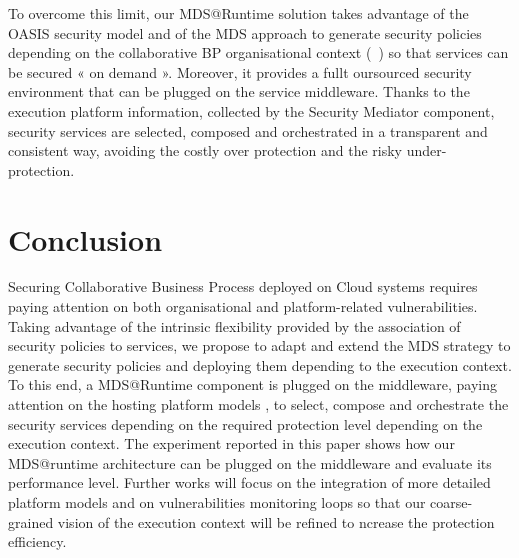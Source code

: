 \documentclass[runningheads,a4paper]{llncs}
\begin{document}
To overcome this limit, our MDS@Runtime solution takes advantage of the OASIS security model and of the MDS approach to generate security policies depending on the collaborative BP organisational context (~\cite{OFG13}) so that services can be secured « on demand ». Moreover, it provides a fullt oursourced security environment that can be plugged on the service middleware. Thanks to the execution platform information, collected by the Security Mediator component, security services are selected, composed and orchestrated in a transparent and consistent way, avoiding the costly over protection and the risky under-protection.




\section{Conclusion}
Securing Collaborative Business Process deployed on Cloud systems requires paying attention on both organisational and platform-related vulnerabilities. Taking advantage of the intrinsic flexibility provided by the association of security policies to services, we propose to adapt and extend the MDS strategy to generate security policies and deploying them depending to the execution context. To this end, a MDS@Runtime component is plugged on the middleware, paying attention on the hosting platform models , to select, compose and orchestrate the security services depending on the required protection level depending on the execution context.  The experiment reported in this paper shows how our MDS@runtime architecture can be plugged on the middleware and evaluate its performance level.
Further works will focus on the integration of more detailed platform models and on vulnerabilities monitoring loops so that our coarse-grained vision of the execution context will be refined to ncrease the protection efficiency.
\end{document}
